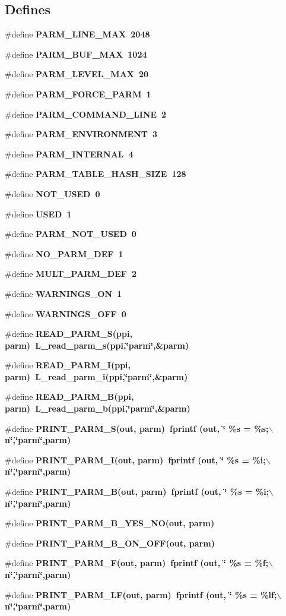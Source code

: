 \subsection*{Defines}
\begin{CompactItemize}
\item 
\#define \bf{PARM\_\-LINE\_\-MAX}~2048
\item 
\#define \bf{PARM\_\-BUF\_\-MAX}~1024
\item 
\#define \bf{PARM\_\-LEVEL\_\-MAX}~20
\item 
\#define \bf{PARM\_\-FORCE\_\-PARM}~1
\item 
\#define \bf{PARM\_\-COMMAND\_\-LINE}~2
\item 
\#define \bf{PARM\_\-ENVIRONMENT}~3
\item 
\#define \bf{PARM\_\-INTERNAL}~4
\item 
\#define \bf{PARM\_\-TABLE\_\-HASH\_\-SIZE}~128
\item 
\#define \bf{NOT\_\-USED}~0
\item 
\#define \bf{USED}~1
\item 
\#define \bf{PARM\_\-NOT\_\-USED}~0
\item 
\#define \bf{NO\_\-PARM\_\-DEF}~1
\item 
\#define \bf{MULT\_\-PARM\_\-DEF}~2
\item 
\#define \bf{WARNINGS\_\-ON}~1
\item 
\#define \bf{WARNINGS\_\-OFF}~0
\item 
\#define \bf{READ\_\-PARM\_\-S}(ppi, parm)~L\_\-read\_\-parm\_\-s(ppi,\char`\"{}parm\char`\"{},\&parm)
\item 
\#define \bf{READ\_\-PARM\_\-I}(ppi, parm)~L\_\-read\_\-parm\_\-i(ppi,\char`\"{}parm\char`\"{},\&parm)
\item 
\#define \bf{READ\_\-PARM\_\-B}(ppi, parm)~L\_\-read\_\-parm\_\-b(ppi,\char`\"{}parm\char`\"{},\&parm)
\item 
\#define \bf{PRINT\_\-PARM\_\-S}(out, parm)~fprintf (out, \char`\"{}    \%s = \%s;$\backslash$n\char`\"{},\char`\"{}parm\char`\"{},parm)
\item 
\#define \bf{PRINT\_\-PARM\_\-I}(out, parm)~fprintf (out, \char`\"{}    \%s = \%i;$\backslash$n\char`\"{},\char`\"{}parm\char`\"{},parm)
\item 
\#define \bf{PRINT\_\-PARM\_\-B}(out, parm)~fprintf (out, \char`\"{}    \%s = \%i;$\backslash$n\char`\"{},\char`\"{}parm\char`\"{},parm)
\item 
\#define \bf{PRINT\_\-PARM\_\-B\_\-YES\_\-NO}(out, parm)
\item 
\#define \bf{PRINT\_\-PARM\_\-B\_\-ON\_\-OFF}(out, parm)
\item 
\#define \bf{PRINT\_\-PARM\_\-F}(out, parm)~fprintf (out, \char`\"{}    \%s = \%f;$\backslash$n\char`\"{},\char`\"{}parm\char`\"{},parm)
\item 
\#define \bf{PRINT\_\-PARM\_\-LF}(out, parm)~fprintf (out, \char`\"{}    \%s = \%lf;$\backslash$n\char`\"{},\char`\"{}parm\char`\"{},parm)
\end{CompactItemize}
